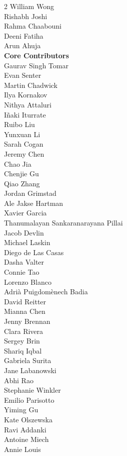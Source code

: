 \begin{multicols}{2}
William Wong \\
Rishabh Joshi \\
Rahma Chaabouni \\
Deeni Fatiha \\
Arun Ahuja \\
\textbf{Core Contributors} \\
Gaurav Singh Tomar \\
Evan Senter \\
Martin Chadwick \\
Ilya Kornakov \\
Nithya Attaluri \\
Iñaki Iturrate \\
Ruibo Liu \\
Yunxuan Li \\
Sarah Cogan \\
Jeremy Chen \\
Chao Jia \\
Chenjie Gu \\
Qiao Zhang \\
Jordan Grimstad \\
Ale Jakse Hartman \\
Xavier Garcia \\
Thanumalayan Sankaranarayana Pillai \\
Jacob Devlin \\
Michael Laskin \\
Diego de Las Casas \\
Dasha Valter \\
Connie Tao \\
Lorenzo Blanco \\
Adrià Puigdomènech Badia \\
David Reitter \\
Mianna Chen \\
Jenny Brennan \\
Clara Rivera \\
Sergey Brin \\
Shariq Iqbal \\
Gabriela Surita \\
Jane Labanowski \\
Abhi Rao \\
Stephanie Winkler \\
Emilio Parisotto \\
Yiming Gu \\
Kate Olszewska \\
Ravi Addanki \\
Antoine Miech \\
Annie Louis \\

\end{multicols}
